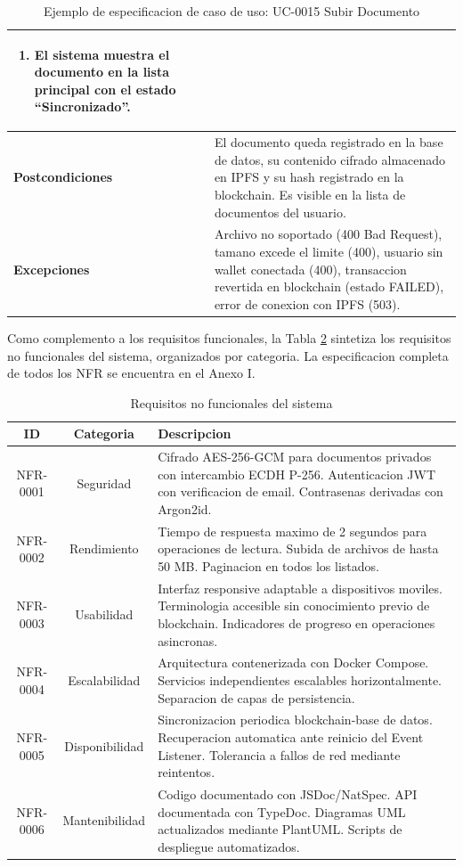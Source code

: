 \documentclass[11pt, a4paper]{article}
\begin{document}
\begin{table}[H]
\begin{tabular}{|p{2.2cm}|p{9.5cm}|}
\begin{enumerate}[nosep,leftmargin=*]
    \item El sistema muestra el documento en la lista principal con el estado ``Sincronizado''.
\end{enumerate} \\
\hline
\textbf{Postcondiciones} & El documento queda registrado en la base de datos, su contenido cifrado almacenado en IPFS y su hash registrado en la blockchain. Es visible en la lista de documentos del usuario. \\
\hline
\textbf{Excepciones} & Archivo no soportado (400 Bad Request), tamano excede el limite (400), usuario sin wallet conectada (400), transaccion revertida en blockchain (estado FAILED), error de conexion con IPFS (503). \\
\hline
\end{tabular}
\caption{Ejemplo de especificacion de caso de uso: UC-0015 Subir Documento}
\label{tab:uc-ejemplo}
\end{table}

Como complemento a los requisitos funcionales, la Tabla \ref{tab:nfr-resumen} sintetiza los requisitos no funcionales del sistema, organizados por categoria. La especificacion completa de todos los NFR se encuentra en el Anexo I.

\begin{table}[H]
\centering
\renewcommand{\arraystretch}{1.4}
\small
\begin{tabular}{|c|c|p{8cm}|}
\hline
\textbf{ID} & \textbf{Categoria} & \textbf{Descripcion} \\
\hline
NFR-0001 & Seguridad & Cifrado AES-256-GCM para documentos privados con intercambio ECDH P-256. Autenticacion JWT con verificacion de email. Contrasenas derivadas con Argon2id. \\
\hline
NFR-0002 & Rendimiento & Tiempo de respuesta maximo de 2 segundos para operaciones de lectura. Subida de archivos de hasta 50 MB. Paginacion en todos los listados. \\
\hline
NFR-0003 & Usabilidad & Interfaz responsive adaptable a dispositivos moviles. Terminologia accesible sin conocimiento previo de blockchain. Indicadores de progreso en operaciones asincronas. \\
\hline
NFR-0004 & Escalabilidad & Arquitectura contenerizada con Docker Compose. Servicios independientes escalables horizontalmente. Separacion de capas de persistencia. \\
\hline
NFR-0005 & Disponibilidad & Sincronizacion periodica blockchain-base de datos. Recuperacion automatica ante reinicio del Event Listener. Tolerancia a fallos de red mediante reintentos. \\
\hline
NFR-0006 & Mantenibilidad & Codigo documentado con JSDoc/NatSpec. API documentada con TypeDoc. Diagramas UML actualizados mediante PlantUML. Scripts de despliegue automatizados. \\
\hline
\end{tabular}
\caption{Requisitos no funcionales del sistema}
\label{tab:nfr-resumen}
\end{table}
\end{document}
